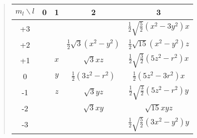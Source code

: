 \documentclass[%
twoside,                 %
final,                   %
10pt]{article}
\begin{document}
\begin{quote}
\begin{tabular}{ccccc}
\hline
\multicolumn{1}{c}{ $m_l\backslash l$ } & \multicolumn{1}{c}{ 0 } & \multicolumn{1}{c}{ 1 } & \multicolumn{1}{c}{ 2 } & \multicolumn{1}{c}{ 3 } \\
\hline
+3                &   &     &                                & $\frac{1}{2}\sqrt{\frac{5}{2}}(x^2-3y^2)x$ \\
+2                &   &     & $\frac{1}{2}\sqrt{3}(x^2-y^2)$ & $\frac{1}{2}\sqrt{15}(x^2-y^2)z$           \\
+1                &   & $x$ & $\sqrt{3}xz$                   & $\frac{1}{2}\sqrt{\frac{3}{2}}(5z^2-r^2)x$ \\
0                 &   & $y$ & $\frac{1}{2}(3z^2-r^2)$        & $\frac{1}{2}(5z^2-3r^2)x$                  \\
-1                &   & $z$ & $\sqrt{3}yz$                   & $\frac{1}{2}\sqrt{\frac{3}{2}}(5z^2-r^2)y$ \\
-2                &   &     & $\sqrt{3}xy$                   & $\sqrt{15}xyz$                             \\
-3                &   &     &                                & $\frac{1}{2}\sqrt{\frac{5}{2}}(3x^2-y^2)y$ \\
\hline
\end{tabular}
\end{quote}

\noindent






\printindex
\end{document}
